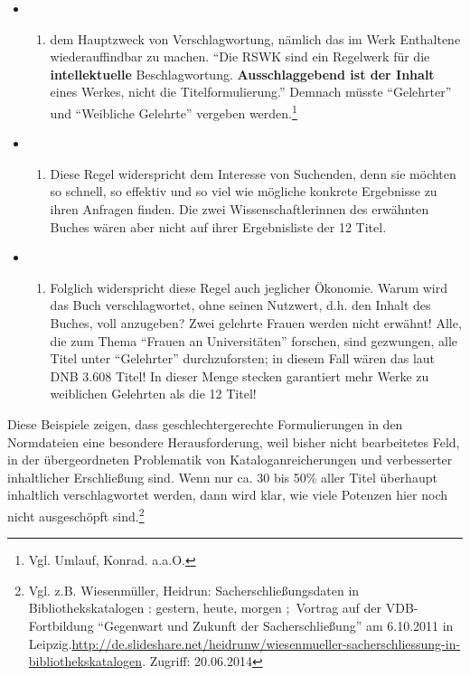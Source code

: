 \documentclass[a4paper,
fontsize=11pt,
oneside,
numbers=noperiodatend,
parskip=half-,
bibliography=totoc,
final
]{scrartcl}
\begin{document}
\begin{itemize}
\item
  \begin{enumerate}
  \def\labelenumi{\alph{enumi})}
  \itemsep1pt\parskip0pt
  \item
    dem Hauptzweck von Verschlagwortung, nämlich das im Werk Enthaltene
    wiederauffindbar zu machen. \enquote{Die RSWK sind ein Regelwerk für
    die \textbf{intellektuelle} Beschlagwortung. \textbf{Ausschlaggebend
    ist der Inhalt} eines Werkes, nicht die Titelformulierung.} Demnach
    müsste \enquote{Gelehrter} und \enquote{Weibliche Gelehrte} vergeben
    werden.\footnote{Vgl. Umlauf, Konrad. a.a.O.}
  \end{enumerate}
\item
  \begin{enumerate}
  \def\labelenumi{\alph{enumi})}
  \setcounter{enumi}{1}
  \itemsep1pt\parskip0pt
  \item
    Diese Regel widerspricht dem Interesse von Suchenden, denn sie
    möchten so schnell, so effektiv und so viel wie mögliche konkrete
    Ergebnisse zu ihren Anfragen finden. Die zwei Wissenschaftlerinnen
    des erwähnten Buches wären aber nicht auf ihrer Ergebnisliste der 12
    Titel.
  \end{enumerate}
\item
  \begin{enumerate}
  \def\labelenumi{\alph{enumi})}
  \setcounter{enumi}{2}
  \itemsep1pt\parskip0pt
  \item
    Folglich widerspricht diese Regel auch jeglicher Ökonomie. Warum
    wird das Buch verschlagwortet, ohne seinen Nutzwert, d.h. den Inhalt
    des Buches, voll anzugeben? Zwei gelehrte Frauen werden nicht
    erwähnt! Alle, die zum Thema \enquote{Frauen an Universitäten}
    forschen, sind gezwungen, alle Titel unter \enquote{Gelehrter}
    durchzuforsten; in diesem Fall wären das laut DNB 3.608 Titel! In
    dieser Menge stecken garantiert mehr Werke zu weiblichen Gelehrten
    als die 12 Titel!
  \end{enumerate}
\end{itemize}

Diese Beispiele zeigen, dass geschlechtergerechte Formulierungen in den
Normdateien eine besondere Herausforderung, weil bisher nicht
bearbeitetes Feld, in der übergeordneten Problematik von
Kataloganreicherungen und verbesserter inhaltlicher Erschließung sind.
Wenn nur ca. 30 bis 50\% aller Titel überhaupt inhaltlich
verschlagwortet werden, dann wird klar, wie viele Potenzen hier noch
nicht ausgeschöpft sind.\footnote{Vgl. z.B. Wiesenmüller, Heidrun:
  Sacherschließungsdaten in Bibliothekskatalogen : gestern, heute,
  morgen ;~Vortrag auf der VDB-Fortbildung \enquote{Gegenwart und
  Zukunft der Sacherschließung} am 6.10.2011 in
  Leipzig.\url{http://de.slideshare.net/heidrunw/wiesenmueller-sacherschliessung-in-bibliothekskatalogen}.
  Zugriff: 20.06.2014}
\end{document}
